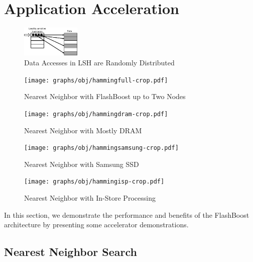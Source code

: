 
\section{Application Acceleration}
\label{sec:acceleration}
\begin{figure}[t!]
	\centering
	\includegraphics[width=0.25\textwidth]{figures/lsh-crop.pdf}
	\caption{Data Accesses in LSH are Randomly Distributed}
	\label{fig:lsh}
\end{figure}


\begin{figure}[t]
\centering
\vspace{0pt}
\begin{minipage}[c]{.2\textwidth}
	\texttt{[image: graphs/obj/hammingfull-crop.pdf]}
	\caption{Nearest Neighbor with FlashBoost up to Two Nodes}
	\label{fig:result_hammingfull}
\end{minipage}\hfill
\vspace{0pt}
\begin{minipage}[c]{.2\textwidth}
	\texttt{[image: graphs/obj/hammingdram-crop.pdf]}
	\caption{Nearest Neighbor with Mostly DRAM}
	\label{fig:result_hammingdram}
\end{minipage}\hfill
\vspace{0pt}
\begin{minipage}[c]{.2\textwidth}
	\texttt{[image: graphs/obj/hammingsamsung-crop.pdf]}
	\caption{Nearest Neighbor with Samsung SSD}
	\label{fig:result_hammingsamsung}
\end{minipage}\hfill
\vspace{0pt}
\begin{minipage}[c]{.2\textwidth}
	\texttt{[image: graphs/obj/hammingisp-crop.pdf]}
	\caption{Nearest Neighbor with In-Store Processing}
	\label{fig:result_hammingisp}
\end{minipage}
\end{figure}

In this section, we demonstrate the performance and benefits of the FlashBoost
architecture by presenting some accelerator demonstrations. 

\subsection{Nearest Neighbor Search}


